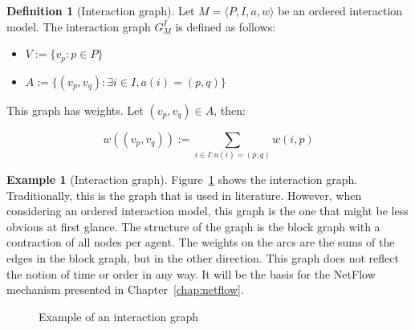 \documentclass[a4paper,11pt]{book}
\theoremstyle{definition}
\newtheorem{definition}{Definition}
\newtheorem{example}{Example}
\begin{document}
\begin{definition}[Interaction graph]
    Let $M =  \langle P, I, a, w \rangle$ be an ordered interaction model. The interaction graph $G^I_M$ is defined as follows:

    \begin{itemize}
        \item $V := \{ v_p : p \in P \}$\\
        \item $A := \{ (v_p, v_q) : \exists i \in I, a(i) = (p, q)  \}$ \\
    \end{itemize}

    This graph has weights. Let $(v_{p}, v_q) \in A$, then:

    \begin{equation*}
        w((v_{p}, v_q)) := \sum_{i \in I : a(i) = (p, q)} w(i, p)
    \end{equation*}
\end{definition}

\begin{example}[Interaction graph]
Figure~\ref{fig:ex_ig} shows the interaction graph. Traditionally, this is the graph
that is used in literature. However, when considering an ordered interaction model, this
graph is the one that might be less obvious at first glance. The structure of the graph
is the block graph with a contraction of all nodes per agent. The weights on the arcs are
the sums of the edges in the block graph, but in the other direction. This graph does
not reflect the notion of time or order in any way. It will be the basis for the
NetFlow mechanism presented in Chapter~\ref{chap:netflow}.

\begin{figure}[h]
    \centering
     \caption{Example of an interaction graph}
     \label{fig:ex_ig}
\end{figure}
\end{example}
\end{document}
